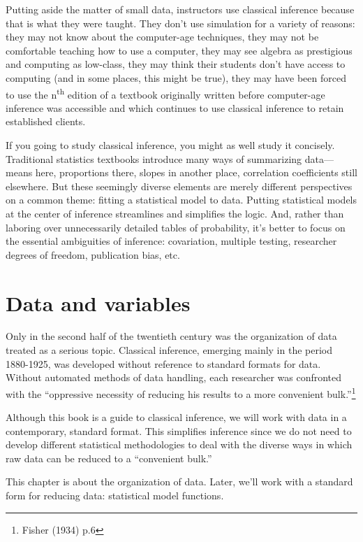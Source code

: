 \documentclass[]{tufte-book}
\begin{document}
Putting aside the matter of small data, instructors use classical inference because that is what they were taught. They don't use simulation for a variety of reasons: they may not know about the computer-age techniques, they may not be comfortable teaching how to use a computer, they may see algebra as prestigious and computing as low-class, they may think their students don't have access to computing (and in some places, this might be true), they may have been forced to use the n\textsuperscript{th} edition of a textbook originally written before computer-age inference was accessible and which continues to use classical inference to retain established clients.

If you going to study classical inference, you might as well study it concisely. Traditional statistics textbooks introduce many ways of summarizing data---means here, proportions there, slopes in another place, correlation coefficients still elsewhere. But these seemingly diverse elements are merely different perspectives on a common theme: fitting a statistical model to data. Putting statistical models at the center of inference streamlines and simplifies the logic. And, rather than laboring over unnecessarily detailed tables of probability, it's better to focus on the essential ambiguities of inference: covariation, multiple testing, researcher degrees of freedom, publication bias, etc.

\hypertarget{data-and-variables}{%
\chapter{Data and variables}\label{data-and-variables}}

Only in the second half of the twentieth century was the organization of data treated as a serious topic. Classical inference, emerging mainly in the period 1880-1925, was developed without reference to standard formats for data. Without automated methods of data handling, each researcher was confronted with the ``oppressive necessity of reducing his results to a more convenient bulk.''\footnote{Fisher (1934) p.6}

Although this book is a guide to classical inference, we will work with data in a contemporary, standard format. This simplifies inference since we do not need to develop different statistical methodologies to deal with the diverse ways in which raw data can be reduced to a ``convenient bulk.''

This chapter is about the organization of data. Later, we'll work with a standard form for reducing data: statistical model functions.
\end{document}
